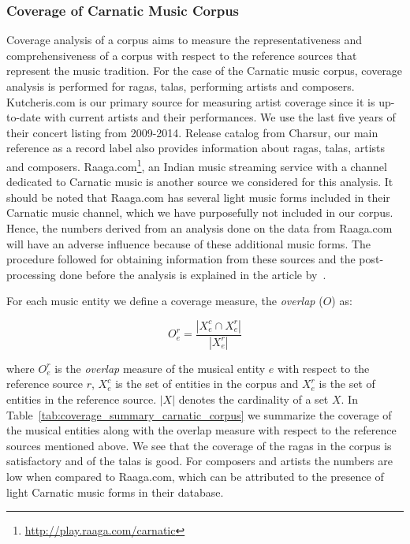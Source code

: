 \subsubsection{Coverage of Carnatic Music Corpus}
\label{sec:corpus_coverage_of_carnatic_music_corpus}

Coverage analysis of a corpus aims to measure the representativeness and comprehensiveness of a corpus with respect to the reference sources that represent the music tradition. For the case of the Carnatic music corpus, coverage analysis is performed for \glspl{raga}, \glspl{tala}, performing artists and composers. Kutcheris.com is our primary source for measuring artist coverage since it is up-to-date with current artists and their performances. We use the last five years of their concert listing from 2009-2014. Release catalog from Charsur, our main reference as a record label also provides information about \glspl{raga}, \glspl{tala}, artists and composers. Raaga.com\footnote{\url{http://play.raaga.com/carnatic}}, an Indian music streaming service with a channel dedicated to Carnatic music is another source we considered for this analysis. It should be noted that Raaga.com has several light music forms included in their Carnatic music channel, which we have purposefully not included in our corpus. Hence, the numbers derived from an analysis done on the data from Raaga.com will have an adverse influence because of these additional music forms. The procedure followed for obtaining information from these sources and the post-processing done before the analysis is explained in the article by~\cite{CM_Corpora_Ajay14}.

For each music entity we define a coverage measure, the \textit{overlap} ($O$) as:

\begin{equation}
	O_{e}^{r} = \frac{ | X_{e}^{c} \cap X_{e}^{r} | }{ | X_{e}^{r} |}
	\label{eq:coverage_measure}
\end{equation}

\noindent where $O_{e}^{r}$ is the \textit{overlap} measure of the musical entity $e$ with respect to the reference source $r$, $X_{e}^{c}$ is the set of entities in the corpus and $X_{e}^{r}$ is the set of entities in the reference source. $|X|$ denotes the cardinality of a set $X$. In Table~\ref{tab:coverage_summary_carnatic_corpus} we summarize the coverage of the musical entities along with the overlap measure with respect to the reference sources mentioned above. We see that the coverage of the \glspl{raga} in the corpus is satisfactory and of the \glspl{tala} is good. For composers and artists the numbers are low when compared to Raaga.com, which can be attributed to the presence of light Carnatic music forms in their database. 

